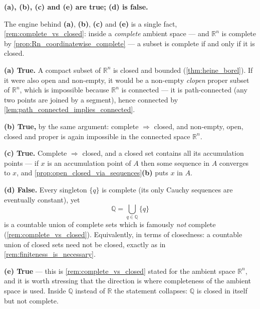 \begin{exercisesolution}
\textbf{(a), (b), (c) and (e) are true; (d) is false.}

The engine behind \textbf{(a)}, \textbf{(b)}, \textbf{(c)} and \textbf{(e)} is a single fact,
\cref{rem:complete_vs_closed}: inside a \emph{complete} ambient space --- and $\mathbb{R}^n$ is
complete by \cref{prop:Rn_coordinatewise_complete} --- a subset is complete if and only if it is
closed.

\textbf{(a) True.} A compact subset of $\mathbb{R}^n$ is closed and bounded
(\cref{thm:heine_borel}). If it were also open and non-empty, it would be a non-empty
\emph{clopen} proper subset of $\mathbb{R}^n$, which is impossible because $\mathbb{R}^n$ is
connected --- it is path-connected (any two points are joined by a segment), hence connected by
\cref{lem:path_connected_implies_connected}.

\textbf{(b) True,} by the same argument: complete $\Rightarrow$ closed, and non-empty, open,
closed and proper is again impossible in the connected space $\mathbb{R}^n$.

\textbf{(c) True.} Complete $\Rightarrow$ closed, and a closed set contains all its accumulation
points --- if $x$ is an accumulation point of $A$ then some sequence in $A$ converges to $x$,
and \cref{prop:open_closed_via_sequences}\textbf{(b)} puts $x$ in $A$.

\textbf{(d) False.} Every singleton $\{q\}$ is complete (its only Cauchy sequences are
eventually constant), yet
\[\mathbb{Q} = \bigcup_{q \in \mathbb{Q}}\{q\}\]
is a countable union of complete sets which is famously \emph{not} complete
(\cref{rem:complete_vs_closed}). Equivalently, in terms of closedness: a countable union of
closed sets need not be closed, exactly as in \cref{rem:finiteness_is_necessary}.

\textbf{(e) True} --- this is \cref{rem:complete_vs_closed} stated for the ambient space
$\mathbb{R}^n$, and it is worth stressing that the  direction is where completeness of the
ambient space is used. Inside $\mathbb{Q}$ instead of $\mathbb{R}$ the statement collapses:
$\mathbb{Q}$ is closed in itself but not complete.
\end{exercisesolution}

